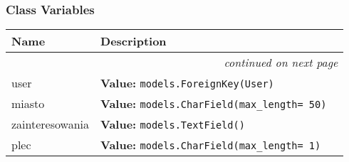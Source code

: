   \subsubsection{Class Variables}

    \vspace{-1cm}
\hspace{\varindent}\begin{longtable}{|p{\varnamewidth}|p{\vardescrwidth}|l}
\cline{1-2}
\cline{1-2} \centering \textbf{Name} & \centering \textbf{Description}& \\
\cline{1-2}
\endhead\cline{1-2}\multicolumn{3}{r}{\small\textit{continued on next page}}\\\endfoot\cline{1-2}
\endlastfoot\raggedright u\-s\-e\-r\- & \raggedright \textbf{Value:} 
{\tt models.ForeignKey(User)}&\\
\cline{1-2}
\raggedright m\-i\-a\-s\-t\-o\- & \raggedright \textbf{Value:} 
{\tt models.CharField(max\_length= 50)}&\\
\cline{1-2}
\raggedright z\-a\-i\-n\-t\-e\-r\-e\-s\-o\-w\-a\-n\-i\-a\- & \raggedright \textbf{Value:} 
{\tt models.TextField()}&\\
\cline{1-2}
\raggedright p\-l\-e\-c\- & \raggedright \textbf{Value:} 
{\tt models.CharField(max\_length= 1)}&\\
\cline{1-2}
\end{longtable}


